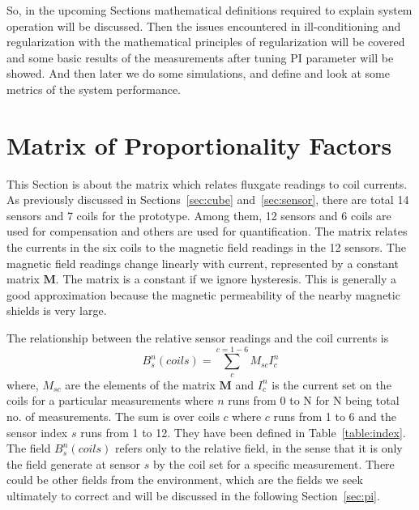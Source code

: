 So, in the upcoming Sections mathematical definitions required to explain system operation will be discussed. Then the issues encountered in ill-conditioning and regularization with the mathematical principles of regularization will be covered and some basic results of the measurements after tuning PI parameter will be showed. And then later we do some simulations, and define and look at some metrics of the system performance.

\section{Matrix of Proportionality Factors}\label{sec:m}

This Section is about the matrix which relates fluxgate readings to coil currents. As previously discussed in Sections~\ref{sec:cube} and~\ref{sec:sensor}, there are total 14 sensors and 7 coils for the prototype. Among them, 12 sensors and 6 coils are used for compensation and others are used for quantification. The matrix relates the currents in the six coils to the magnetic field readings in the 12 sensors. The magnetic field readings change linearly with current, represented by a constant matrix $\bm{M}$.  The matrix is a constant if we ignore hysteresis.  This is generally a good approximation because the magnetic permeability of the nearby magnetic shields is very large.

The relationship between the relative sensor readings and the coil currents is
\begin{equation}\label{eq:B_coils}
B_s^n(coils)=\sum_c^{c=1-6} M_{sc} I_c^n
\end{equation}
where, $M_{sc}$ are the elements of the matrix $\bm{M}$ and $I_c^n$ is the current set on the coils for a particular measurements where $n$ runs from 0 to N for N being total no. of measurements. The sum is over coils $c$ where $c$ runs from 1 to 6 and the sensor index $s$ runs from 1 to 12. They have been defined in Table~\ref{table:index}. The field $B_s^n(coils)$ refers only to the relative field, in the sense that it is only the field generate at sensor $s$ by the coil set for a specific measurement.  There could be other fields from the environment, which are the fields we seek ultimately to correct and will be discussed in the following Section~\ref{sec:pi}.


